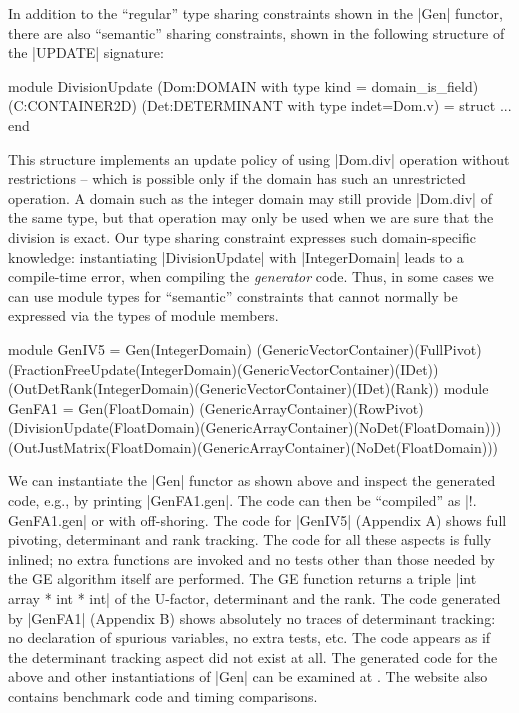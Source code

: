 \documentclass[draft]{elsart}
\begin{document}
In addition to the ``regular'' type sharing constraints shown in the
|Gen| functor, there are also ``semantic'' sharing constraints, shown
in the following structure of the |UPDATE| signature:
\vspace*{-5pt}\begin{code}
module DivisionUpdate
  (Dom:DOMAIN with type kind = domain_is_field)
  (C:CONTAINER2D)
  (Det:DETERMINANT with type indet=Dom.v) = struct ... end
\end{code}
\vspace*{-4pt} 
This structure implements an update policy of using
|Dom.div| operation without restrictions -- which is possible only if
the domain has such an unrestricted operation. A domain such as the integer
domain may still provide |Dom.div| of the same type, but that operation may
only be used when we are sure that the division is exact. Our type
sharing constraint expresses such domain-specific knowledge:
instantiating |DivisionUpdate| with |IntegerDomain| leads to a
compile-time error, when compiling the \emph{generator} code. Thus, in
some cases we can use module types for ``semantic'' constraints
that cannot normally be expressed via the types of module members.
\vspace*{-5pt}
\begin{code}
module GenIV5 = Gen(IntegerDomain)
   (GenericVectorContainer)(FullPivot)
   (FractionFreeUpdate(IntegerDomain)(GenericVectorContainer)(IDet))
   (OutDetRank(IntegerDomain)(GenericVectorContainer)(IDet)(Rank))
module GenFA1 = Gen(FloatDomain)
   (GenericArrayContainer)(RowPivot)
   (DivisionUpdate(FloatDomain)(GenericArrayContainer)(NoDet(FloatDomain)))
   (OutJustMatrix(FloatDomain)(GenericArrayContainer)(NoDet(FloatDomain)))
\end{code}
\vspace*{-5pt}
We can instantiate the |Gen| functor as shown above and inspect the generated
code, e.g., by printing |GenFA1.gen|. The code can then be ``compiled'' as 
|!. GenFA1.gen| or with off-shoring. The code for |GenIV5| (Appendix A) shows
full pivoting, determinant and rank tracking. The code for all these aspects is
fully inlined; no extra functions are invoked and no tests other than those
needed by the GE algorithm itself are performed. The GE function returns a
triple |int array * int * int| of the U-factor, determinant and the rank. The
code generated by |GenFA1| (Appendix B) shows absolutely no traces of
determinant tracking: no declaration of spurious variables, no extra tests,
etc. The code appears as if the determinant tracking aspect did not exist
at all. The generated code for the above and other instantiations of
|Gen| can be examined at \cite{metamonadsURL}. The website also 
contains benchmark code and timing comparisons.
\end{document}

